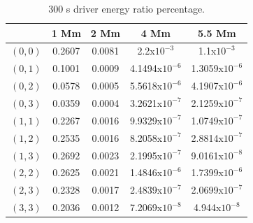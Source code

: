 \documentclass[preprint,authoryear,12pt]{elsarticle}
\begin{document}
\begin{table}[h]
\centering
\begin{tabular}{c c c c c }
\hline
   &  1 Mm & 2 Mm & 4 Mm & 5.5 Mm \\
\hline
$(0, 0)$ &  0.2607 & 0.0081 & 2.2x$10^{-3}$ &  1.1x$10^{-3}$\\
\hline
$(0, 1)$ & 0.1001 & 0.0009 & 4.1494x$10^{-6}$ &  1.3059x$10^{-6}$\\
\hline
$(0, 2)$ & 0.0578 & 0.0005 & 5.5618x$10^{-6}$ &  4.1907x$10^{-6}$\\
\hline
$(0, 3)$ & 0.0359 & 0.0004 &3.2621x$10^{-7}$ &  2.1259x$10^{-7}$\\
\hline
$(1, 1)$ & 0.2267 & 0.0016 & 9.9329x$10^{-7}$ &  1.0749x$10^{-7}$\\
\hline
$(1, 2)$ & 0.2535 & 0.0016 & 8.2058x$10^{-7}$ &  2.8814x$10^{-7}$\\
\hline
$(1, 3)$ & 0.2692 & 0.0023 & 2.1995x$10^{-7}$ &  9.0161x$10^{-8}$\\
\hline
$(2, 2)$ & 0.2625 & 0.0021 & 1.4846x$10^{-6}$ &  1.7399x$10^{-6}$\\
\hline
$(2, 3)$ & 0.2328 & 0.0017 & 2.4839x$10^{-7}$ &  2.0699x$10^{-7}$\\
\hline
$(3, 3)$ & 0.2036 & 0.0012 & 7.2069x$10^{-8}$ &  4.944x$10^{-8}$\\
\hline
\end{tabular} 
\caption{300 s driver energy ratio percentage.}
\label{Table300mode}
\end{table}
\end{document}
